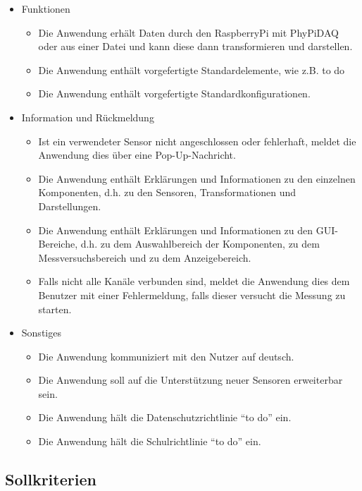 \documentclass[parskip=full]{scrartcl}
\begin{document}
\begin{itemize}
\item Funktionen
\begin{itemize}

\item Die Anwendung erhält Daten durch den RaspberryPi mit PhyPiDAQ oder aus einer Datei und kann diese dann transformieren und darstellen.
\item Die Anwendung enthält vorgefertigte Standardelemente, wie z.B. to do
\item Die Anwendung enthält vorgefertigte Standardkonfigurationen.

\end{itemize}

\item Information und Rückmeldung
\begin{itemize}

\item Ist ein verwendeter Sensor nicht angeschlossen oder fehlerhaft, meldet die Anwendung dies über eine Pop-Up-Nachricht.
\item Die Anwendung enthält Erklärungen und Informationen zu den einzelnen Komponenten, d.h. zu den Sensoren, Transformationen und Darstellungen.
\item Die Anwendung enthält Erklärungen und Informationen zu den GUI-Bereiche, d.h. zu dem Auswahlbereich der Komponenten, zu dem Messversuchsbereich und zu dem Anzeigebereich.
\item Falls nicht alle Kanäle verbunden sind, meldet die Anwendung dies dem Benutzer mit einer Fehlermeldung, falls dieser versucht die Messung zu starten. 

\end{itemize}

\item Sonstiges
\begin{itemize}

\item Die Anwendung kommuniziert mit den Nutzer auf deutsch.
\item Die Anwendung soll auf die Unterstützung neuer Sensoren erweiterbar sein.
\item Die Anwendung hält die Datenschutzrichtlinie "`to do"' ein.
\item Die Anwendung hält die Schulrichtlinie "`to do"' ein.

\end{itemize}

 \end{itemize}

\subsection{Sollkriterien}
\end{document}

